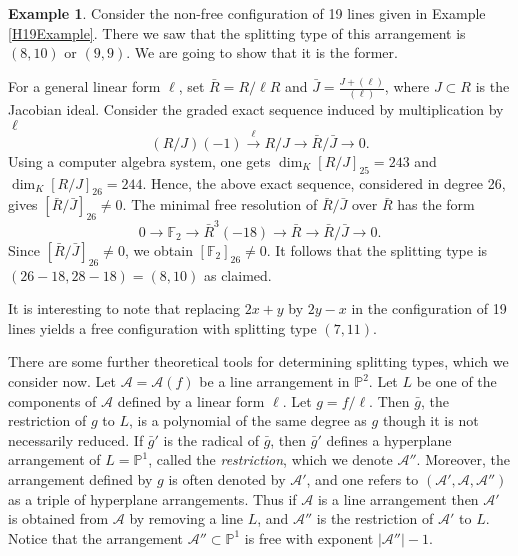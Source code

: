 \documentclass[12pt]{amsart}
\numberwithin{equation}{section}
\theoremstyle{definition}
\newtheorem{example}[theorem]{Example}
\begin{document}
\begin{example}\label{H_19Finished}
Consider the non-free configuration of 19 lines given in Example \ref{H19Example}. There we saw that the splitting type of this arrangement is $(8, 10)$ or $(9, 9)$. We are going to show that it is the former. 

For a  general linear form $\ell$, set $\bar{R} = R/\ell R$ and $\bar{J} = \frac{J+(\ell)}{(\ell)}$, where $J \subset R$ is the Jacobian ideal. 
Consider the graded exact sequence induced by multiplication by $\ell$
\[
(R/J) (-1)  \stackrel{\ell}\longrightarrow R/J \to \bar{R}/\bar{J} \to 0. 
\]
Using a computer algebra system,  one gets $\dim_K [R/J]_{25} = 243$ and $\dim_K [R/J]_{26} = 244$. Hence, the above exact sequence, considered in degree 26, gives  $[\bar{R}/\bar{J}]_{26} \neq 0$. The minimal free resolution of $\bar{R}/\bar{J}$ over $\bar{R}$ has the form
\[
0 \to \mathbb F_2 \to \bar{R}^3 (-18) \to \bar{R} \to \bar{R}/\bar{J} \to 0. 
\]
Since $[\bar{R}/\bar{J}]_{26} \neq 0$, we obtain $[\mathbb F_2]_{26} \neq 0$. It follows that the splitting type is $(26-18,28-18) = (8,10)$ as claimed.

It is interesting to note that replacing $2x+y$ by $2y-x$ in the configuration of 19 lines
yields a free configuration with splitting type $(7, 11)$.
\end{example}

There are some further theoretical tools for determining splitting types, which we consider now. 
Let ${\mathcal{A}} = {\mathcal{A}} (f)$ be a line arrangement in ${ \ensuremath{\mathbb{P}}}^2$.   Let $L$ be one of the components of ${\mathcal{A}}$ defined by a linear form $\ell$.  Let
$g = f/\ell$.  Then $\bar{g}$, the restriction of $g$ to $L$, is a polynomial of  the same degree as
$g$ though it is not necessarily reduced.  If $\bar{g}'$ is the radical of $\bar{g}$, then 
$\bar{g}'$ defines a hyperplane arrangement  of $L = { \ensuremath{\mathbb{P}}}^1$, called the \emph{restriction}, which we
denote ${\mathcal{A}}''$. Moreover, the arrangement defined by $g$ is often denoted by ${\mathcal{A}}'$, and one  
refers to $(\mathcal A', \mathcal A, \mathcal A'')$ as a triple of hyperplane arrangements. 
Thus if $\mathcal A$ is a line arrangement then $\mathcal A'$ is obtained from 
$\mathcal A$ by removing a line $L$, and $\mathcal A''$ is the restriction of $\mathcal A'$ to $L$.
Notice that the arrangement $\mathcal A'' \subset \mathbb P^1$ is free with exponent $|\mathcal A''|-1$.
\end{document}
